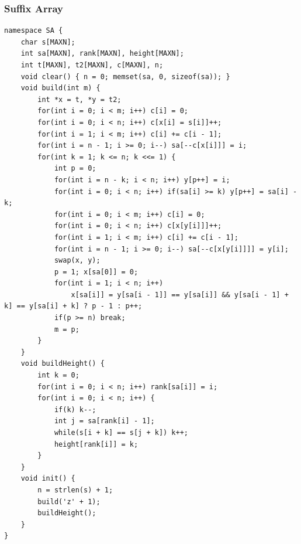 \documentclass[10pt]{ctexart}
\begin{document}
{\subsubsection{Suffix Array}
\begin{lstlisting}
namespace SA {
    char s[MAXN];
    int sa[MAXN], rank[MAXN], height[MAXN];
    int t[MAXN], t2[MAXN], c[MAXN], n;
    void clear() { n = 0; memset(sa, 0, sizeof(sa)); }
    void build(int m) {
        int *x = t, *y = t2;
        for(int i = 0; i < m; i++) c[i] = 0;
        for(int i = 0; i < n; i++) c[x[i] = s[i]]++;
        for(int i = 1; i < m; i++) c[i] += c[i - 1];
        for(int i = n - 1; i >= 0; i--) sa[--c[x[i]]] = i;
        for(int k = 1; k <= n; k <<= 1) {
            int p = 0;
            for(int i = n - k; i < n; i++) y[p++] = i;
            for(int i = 0; i < n; i++) if(sa[i] >= k) y[p++] = sa[i] - k;
            for(int i = 0; i < m; i++) c[i] = 0;
            for(int i = 0; i < n; i++) c[x[y[i]]]++;
            for(int i = 1; i < m; i++) c[i] += c[i - 1];
            for(int i = n - 1; i >= 0; i--) sa[--c[x[y[i]]]] = y[i];
            swap(x, y);
            p = 1; x[sa[0]] = 0;
            for(int i = 1; i < n; i++)
                x[sa[i]] = y[sa[i - 1]] == y[sa[i]] && y[sa[i - 1] + k] == y[sa[i] + k] ? p - 1 : p++;
            if(p >= n) break;
            m = p;
        }
    }
    void buildHeight() {
        int k = 0;
        for(int i = 0; i < n; i++) rank[sa[i]] = i;
        for(int i = 0; i < n; i++) {
            if(k) k--;
            int j = sa[rank[i] - 1];
            while(s[i + k] == s[j + k]) k++;
            height[rank[i]] = k;
        }
    }
    void init() {
        n = strlen(s) + 1;
        build('z' + 1);
        buildHeight();
    }
}
\end{lstlisting}
}
\end{document}
